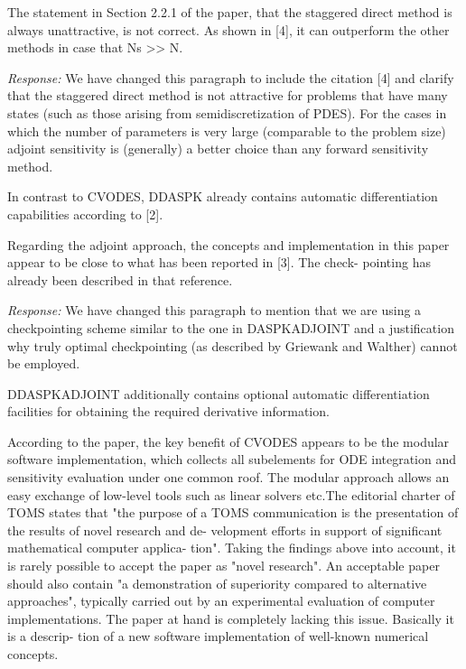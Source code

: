 The statement in Section 2.2.1 of the paper, that the staggered direct method 
is always unattractive, is not correct. As shown in [4], it can outperform the 
other methods in case that Ns >>  N. 

{\em Response:}
We have changed this paragraph to include the citation [4] and 
clarify that the staggered direct method is not attractive for problems that 
have many states (such as those arising from semidiscretization of PDES).
For the cases in which the number of parameters is very large (comparable
to the problem size) adjoint sensitivity is (generally) a better choice than 
any forward sensitivity method.

In contrast to CVODES, DDASPK already contains automatic differentiation capabilities 
according to [2].

Regarding the adjoint approach, the concepts and implementation in
this paper appear to be close to what has been reported in [3]. The check-
pointing has already been described in that reference. 

{\em Response:}
We have changed this paragraph to mention that we are 
using a checkpointing scheme similar to the one in DASPKADJOINT
and a justification why truly optimal checkpointing (as described
by Griewank and Walther) cannot be employed.

DDASPKADJOINT additionally contains optional automatic differentiation facilities 
for obtaining the required derivative information.

According to the paper, the key benefit of CVODES appears to be the
modular software implementation, which collects all subelements for ODE
integration and sensitivity evaluation under one common roof. The modular
approach allows an easy exchange of low-level tools such as linear solvers
etc.The editorial charter of TOMS states that "the purpose of a TOMS
communication is the presentation of the results of novel research and de-
velopment efforts in support of significant mathematical computer applica-
tion". Taking the findings above into account, it is rarely possible to accept
the paper as "novel research". An acceptable paper should also contain "a
demonstration of superiority compared to alternative approaches", typically
carried out by an experimental evaluation of computer implementations.
The paper at hand is completely lacking this issue. Basically it is a descrip-
tion of a new software implementation of well-known numerical concepts.


